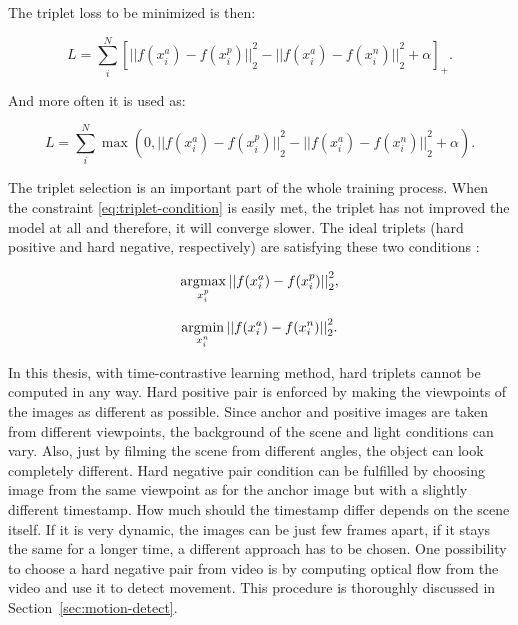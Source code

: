 The triplet loss to be minimized is then:

\begin{equation}
    \label{eq:triplet-loss1}
    L = \sum\limits^{N}_{i}
    \left[
    {|| f(x^{a}_{i}) - f(x^{p}_{i}) ||}^{2}_{2} - {|| f(x^{a}_{i}) - f(x^{n}_{i}) ||}^{2}_{2} + \alpha
    \right]_{+}.
\end{equation}

\noindent And more often it is used as:

\begin{equation}
    \label{eq:triplet-loss2}
    L = \sum\limits^{N}_{i}
    \max{(0, {|| f(x^{a}_{i}) - f(x^{p}_{i}) ||}^{2}_{2} - {|| f(x^{a}_{i}) - f(x^{n}_{i}) ||}^{2}_{2} + \alpha)}.
\end{equation}

The triplet selection is an important part of the whole training process. When the constraint \ref{eq:triplet-condition} is easily met, the triplet has not improved the model at all and therefore, it will converge slower. The ideal triplets (hard positive and hard negative, respectively) are satisfying these two conditions \cite{facenet-triplet-loss}:

\begin{equation}
    \label{eq:triplet-sel1}
    \operatorname*{arg\!\max}_{x^{p}_{i}}{{|| f(x^{a}_{i}) - f(x^{p}_{i}) ||}^{2}_{2}},
\end{equation}

\begin{equation}
    \label{eq:triplet-sel2}
    \operatorname*{arg\!\min}_{x^{n}_{i}}{{|| f(x^{a}_{i}) - f(x^{n}_{i}) ||}^{2}_{2}}.
\end{equation}

In this thesis, with time-contrastive learning method, hard triplets cannot be computed in any way. Hard positive pair is enforced by making the viewpoints of the images as different as possible. Since anchor and positive images are taken from different viewpoints, the background of the scene and light conditions can vary. Also, just by filming the scene from different angles, the object can look completely different. Hard negative pair condition can be fulfilled by choosing image from the same viewpoint as for the anchor image but with a slightly different timestamp. How much should the timestamp differ depends on the scene itself. If it is very dynamic, the images can be just few frames apart, if it stays the same for a longer time, a different approach has to be chosen. One possibility to choose a hard negative pair from video is by computing optical flow from the video and use it to detect movement. This procedure is thoroughly discussed in Section~\ref{sec:motion-detect}.

